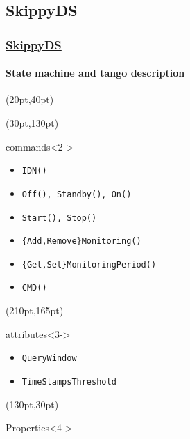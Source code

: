 \documentclass{beamer}
\begin{document}
\subsection{SkippyDS}

\begin{frame}
  \frametitle{\href{https://www.tango-controls.org/developers/dsc/ds/2376/}{SkippyDS}}
  \framesubtitle{State machine and tango description}
  \begin{textblock*}{270pt}(20pt,40pt)
  \end{textblock*}
  \begin{textblock*}{180pt}(30pt,130pt)
    \begin{block}{commands}<2->
      \begin{itemize}
        \item {\tt IDN()}
        \item {\tt Off(), Standby(), On()}
        \item {\tt Start(), Stop()}
        \item {\tt \{Add,Remove\}Monitoring()}
        \item {\tt \{Get,Set\}MonitoringPeriod()}
        \item {\tt CMD()}
      \end{itemize}
    \end{block}
  \end{textblock*}
  \begin{textblock*}{140pt}(210pt,165pt)
    \begin{block}{attributes}<3->
      \begin{itemize}
        \item {\tt QueryWindow}
        \item {\tt TimeStampsThreshold}
      \end{itemize}
    \end{block}
  \end{textblock*}
  \begin{textblock*}{210pt}(130pt,30pt)
    \begin{block}{Properties}<4->

\end{block}
\end{textblock*}
\end{frame}
\end{document}
